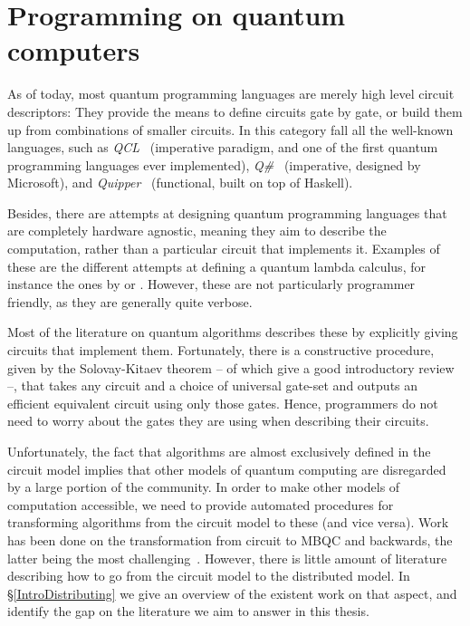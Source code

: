 \section{Programming on quantum computers}

As of today, most quantum programming languages are merely high level circuit descriptors: They provide the means to define circuits gate by gate, or build them up from combinations of smaller circuits. In this category fall all the well-known languages, such as \textit{QCL}~\citep{QCL} (imperative paradigm, and one of the first quantum programming languages ever implemented), \textit{Q\#}~\citep{QLang} (imperative, designed by Microsoft), and \textit{Quipper}~\citep{Quipper} (functional, built on top of Haskell). 

Besides, there are attempts at designing quantum programming languages that are completely hardware agnostic, meaning they aim to describe the computation, rather than a particular circuit that implements it. Examples of these are the different attempts at defining a quantum lambda calculus, for instance the ones by \citet{VanTonder} or \citet{Diaz-Caro}. However, these are not particularly programmer friendly, as they are generally quite verbose.

Most of the literature on quantum algorithms describes these by explicitly giving circuits that implement them. Fortunately, there is a constructive procedure, given by the Solovay-Kitaev theorem -- of which \citet{SolovayKitaev} give a good introductory review --, that takes any circuit and a choice of universal gate-set and outputs an efficient equivalent circuit using only those gates. Hence, programmers do not need to worry about the gates they are using when describing their circuits.

Unfortunately, the fact that algorithms are almost exclusively defined in the circuit model implies that other models of quantum computing are disregarded by a large portion of the community. In order to make other models of computation accessible, we need to provide automated procedures for transforming algorithms from the circuit model to these (and vice versa). Work has been done on the transformation from circuit to MBQC and backwards, the latter being the most challenging~\citep{gflow}. However, there is little amount of literature describing how to go from the circuit model to the distributed model. In \S\ref{IntroDistributing} we give an overview of the existent work on that aspect, and identify the gap on the literature we aim to answer in this thesis.


